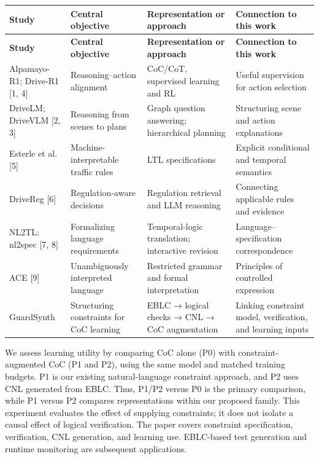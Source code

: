 \documentclass[11pt,a4paper]{article}
\begin{document}
\begingroup\small
\begin{longtable}{@{}>{\raggedright\arraybackslash}p{}>{\raggedright\arraybackslash}p{}>{\raggedright\arraybackslash}p{}>{\raggedright\arraybackslash}p{}@{}}
\toprule
\textbf{Study} & \textbf{Central objective} & \textbf{Representation or approach} & \textbf{Connection to this work} \\
\midrule\endfirsthead
\toprule
\textbf{Study} & \textbf{Central objective} & \textbf{Representation or approach} & \textbf{Connection to this work} \\
\midrule\endhead
\bottomrule\endfoot
Alpamayo-R1; Drive-R1 [1, 4] & Reasoning–action alignment & CoC/CoT, supervised learning and RL & Useful supervision for action selection \\
DriveLM; DriveVLM [2, 3] & Reasoning from scenes to plans & Graph question answering; hierarchical planning & Structuring scene and action explanations \\
Esterle et al. [5] & Machine-interpretable traffic rules & LTL specifications & Explicit conditional and temporal semantics \\
DriveReg [6] & Regulation-aware decisions & Regulation retrieval and LLM reasoning & Connecting applicable rules and evidence \\
NL2TL; nl2spec [7, 8] & Formalizing language requirements & Temporal-logic translation; interactive revision & Language–specification correspondence \\
ACE [9] & Unambiguously interpreted language & Restricted grammar and formal interpretation & Principles of controlled expression \\
GuardSynth & Structuring constraints for CoC learning & EBLC → logical checks → CNL → CoC augmentation & Linking constraint model, verification, and learning inputs \\
\end{longtable}
\endgroup

We assess learning utility by comparing CoC alone (P0) with constraint-augmented CoC (P1 and P2), using the same model and matched training budgets. P1 is our existing natural-language constraint approach, and P2 uses CNL generated from EBLC. Thus, P1/P2 versus P0 is the primary comparison, while P1 versus P2 compares representations within our proposed family. This experiment evaluates the effect of supplying constraints; it does not isolate a causal effect of logical verification. The paper covers constraint specification, verification, CNL generation, and learning use. EBLC-based test generation and runtime monitoring are subsequent applications.\par
\end{document}
